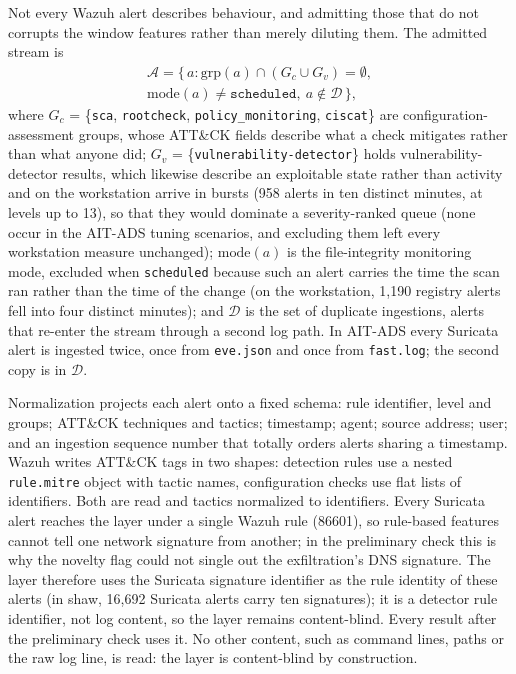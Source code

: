 \documentclass[conference]{IEEEtran}
\begin{document}
Not every Wazuh alert describes behaviour, and admitting those that do not corrupts the window features rather than merely diluting them. The admitted stream is
\begin{multline}
\mathcal{A} = \{\, a : \mathrm{grp}(a) \cap (G_c \cup G_v) = \emptyset, \\
\mathrm{mode}(a) \neq \texttt{scheduled},\ a \notin \mathcal{D} \,\},
\end{multline}
where $G_c$ = \{\texttt{sca}, \texttt{rootcheck}, \texttt{policy\_monitoring}, \texttt{ciscat}\} are configuration-assessment groups, whose ATT\&CK fields describe what a check mitigates rather than what anyone did; $G_v$ = \{\texttt{vulnerability-detector}\} holds vulnerability-detector results, which likewise describe an exploitable state rather than activity and on the workstation arrive in bursts (958 alerts in ten distinct minutes, at levels up to 13), so that they would dominate a severity-ranked queue (none occur in the AIT-ADS tuning scenarios, and excluding them left every workstation measure unchanged); $\mathrm{mode}(a)$ is the file-integrity monitoring mode, excluded when \texttt{scheduled} because such an alert carries the time the scan ran rather than the time of the change (on the workstation, 1{,}190 registry alerts fell into four distinct minutes); and $\mathcal{D}$ is the set of duplicate ingestions, alerts that re-enter the stream through a second log path. In AIT-ADS every Suricata alert is ingested twice, once from \texttt{eve.json} and once from \texttt{fast.log}; the second copy is in $\mathcal{D}$.

Normalization projects each alert onto a fixed schema: rule identifier, level and groups; ATT\&CK techniques and tactics; timestamp; agent; source address; user; and an ingestion sequence number that totally orders alerts sharing a timestamp. Wazuh writes ATT\&CK tags in two shapes: detection rules use a nested \texttt{rule.mitre} object with tactic names, configuration checks use flat lists of identifiers. Both are read and tactics normalized to identifiers. Every Suricata alert reaches the layer under a single Wazuh rule (86601), so rule-based features cannot tell one network signature from another; in the preliminary check this is why the novelty flag could not single out the exfiltration's DNS signature. The layer therefore uses the Suricata signature identifier as the rule identity of these alerts (in shaw, 16{,}692 Suricata alerts carry ten signatures); it is a detector rule identifier, not log content, so the layer remains content-blind. Every result after the preliminary check uses it. No other content, such as command lines, paths or the raw log line, is read: the layer is content-blind by construction.
\end{document}
